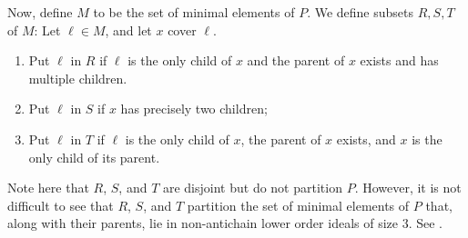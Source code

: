 \documentclass[11pt]{amsart}
\theoremstyle{definition}
\begin{document}
Now, define $ M $ to be the set of minimal elements of $ P $. We define subsets $ R,S,T $ of $ M $: Let $ \ell\in M $, and let $ x $ cover $ \ell $.  \begin{enumerate}
	\item Put $ \ell$ in $ R $ if $ \ell $ is the only child of $ x $ and the parent of $ x $ exists and has multiple children.
	\item Put $ \ell$ in $ S $ if $ x $ has precisely two children;
	\item Put $ \ell$ in $ T $ if $ \ell $ is the only child of $ x $, the parent of $ x $ exists, and $ x $ is the only child of its parent.
\end{enumerate}
Note here that $ R $, $ S $, and $ T $ are disjoint but do not partition $ P $. However, it is not difficult to see that $ R $, $ S $, and $ T $ partition the set of minimal elements of $ P $ that, along with their parents, lie in non-antichain lower order ideals of size 3. See .
\end{document}
